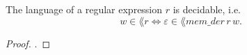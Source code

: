 
        \begin{theorem}
            \label{mem_der_correct} 
            The language of a regular expression $r$ is decidable, i.e.
            \begin{equation*}     w \in \lang{r} \Leftrightarrow \varepsilon \in \lang{mem\_der \, r \, w}.      \end{equation*}
            \end{theorem}
            \begin{proof}
                .
            \end{proof}



